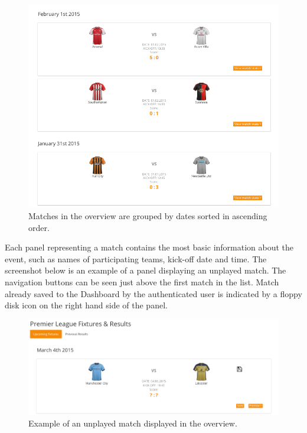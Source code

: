 \begin{figure}[H]
	\begin{center}
		\includegraphics[width=.90\linewidth,natwidth=610,natheight=642]{impl/images/matchesGrouped}
		\caption{Matches in the overview are grouped by dates sorted in ascending order.} \label{fig:using:matchesgrouped}
	\end{center}
\end{figure}
 
Each panel representing a match contains the most basic information about the event, such as names of participating teams, kick-off date and time. The screenshot below is an example of a panel displaying an unplayed match. The navigation buttons can be seen just above the first match in the list. Match already saved to the Dashboard by the authenticated user is indicated by a floppy disk icon on the right hand side of the panel.

\begin{figure}[H]
	\begin{center}
		\includegraphics[width=.90\linewidth,natwidth=610,natheight=642]{impl/images/unplayedMatch}
		\caption{Example of an unplayed match displayed in the overview.} \label{fig:using:unplayedmatch}
	\end{center}
\end{figure}

